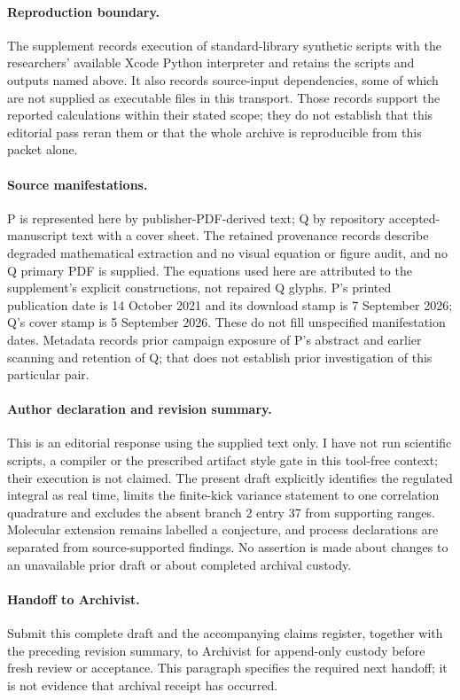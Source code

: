 \documentclass{article}
\begin{document}
\paragraph{Reproduction boundary.}
The supplement records execution of standard-library synthetic scripts with the researchers' available Xcode Python interpreter and retains the scripts and outputs named above. It also records source-input dependencies, some of which are not supplied as executable files in this transport. Those records support the reported calculations within their stated scope; they do not establish that this editorial pass reran them or that the whole archive is reproducible from this packet alone.

\paragraph{Source manifestations.}
P is represented here by publisher-PDF-derived text; Q by repository accepted-manuscript text with a cover sheet. The retained provenance records describe degraded mathematical extraction and no visual equation or figure audit, and no Q primary PDF is supplied. The equations used here are attributed to the supplement's explicit constructions, not repaired Q glyphs. P's printed publication date is 14 October 2021 and its download stamp is 7 September 2026; Q's cover stamp is 5 September 2026. These do not fill unspecified manifestation dates. Metadata records prior campaign exposure of P's abstract and earlier scanning and retention of Q; that does not establish prior investigation of this particular pair.

\paragraph{Author declaration and revision summary.}
This is an editorial response using the supplied text only. I have not run scientific scripts, a compiler or the prescribed artifact style gate in this tool-free context; their execution is not claimed. The present draft explicitly identifies the regulated integral as real time, limits the finite-kick variance statement to one correlation quadrature and excludes the absent branch 2 entry 37 from supporting ranges. Molecular extension remains labelled a conjecture, and process declarations are separated from source-supported findings. No assertion is made about changes to an unavailable prior draft or about completed archival custody.

\paragraph{Handoff to Archivist.}
Submit this complete draft and the accompanying claims register, together with the preceding revision summary, to Archivist for append-only custody before fresh review or acceptance. This paragraph specifies the required next handoff; it is not evidence that archival receipt has occurred.
\end{document}
